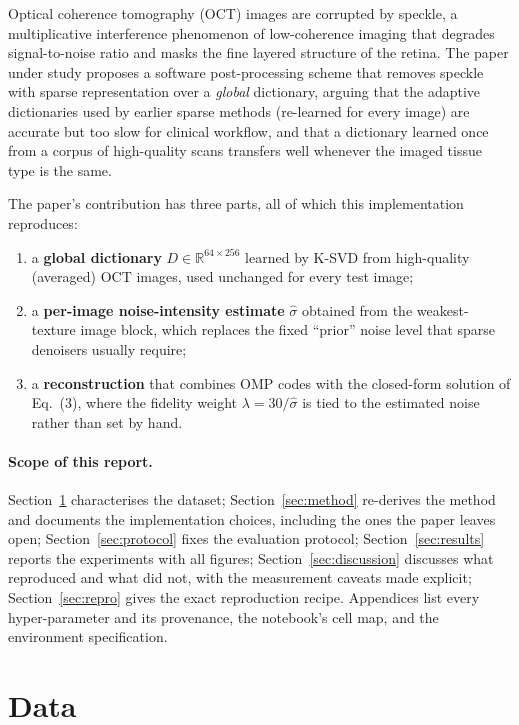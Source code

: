 \documentclass[11pt,a4paper]{article}
\newcommand{\sh}{\hat{\sigma}}
\begin{document}
Optical coherence tomography (OCT) images are corrupted by speckle, a multiplicative interference phenomenon of
low-coherence imaging that degrades signal-to-noise ratio and masks the fine layered structure of the retina. The
paper under study proposes a software post-processing scheme that removes speckle with sparse representation over a
\emph{global} dictionary, arguing that the adaptive dictionaries used by earlier sparse methods (re-learned for every
image) are accurate but too slow for clinical workflow, and that a dictionary learned once from a corpus of
high-quality scans transfers well whenever the imaged tissue type is the same.

The paper's contribution has three parts, all of which this implementation reproduces:
\begin{enumerate}
  \item a \textbf{global dictionary} $D\in\mathbb{R}^{64\times256}$ learned by K-SVD from high-quality (averaged) OCT
        images, used unchanged for every test image;
  \item a \textbf{per-image noise-intensity estimate} $\sh$ obtained from the weakest-texture image block, which
        replaces the fixed ``prior'' noise level that sparse denoisers usually require;
  \item a \textbf{reconstruction} that combines OMP codes with the closed-form solution of Eq.~(3), where the
        fidelity weight $\lambda=30/\sh$ is tied to the estimated noise rather than set by hand.
\end{enumerate}

\paragraph{Scope of this report.}
Section~\ref{sec:data} characterises the dataset; Section~\ref{sec:method} re-derives the method and documents the
implementation choices, including the ones the paper leaves open; Section~\ref{sec:protocol} fixes the evaluation
protocol; Section~\ref{sec:results} reports the experiments with all figures; Section~\ref{sec:discussion} discusses
what reproduced and what did not, with the measurement caveats made explicit; Section~\ref{sec:repro} gives the exact
reproduction recipe. Appendices list every hyper-parameter and its provenance, the notebook's cell map, and the
environment specification.

\section{Data}\label{sec:data}
\end{document}
